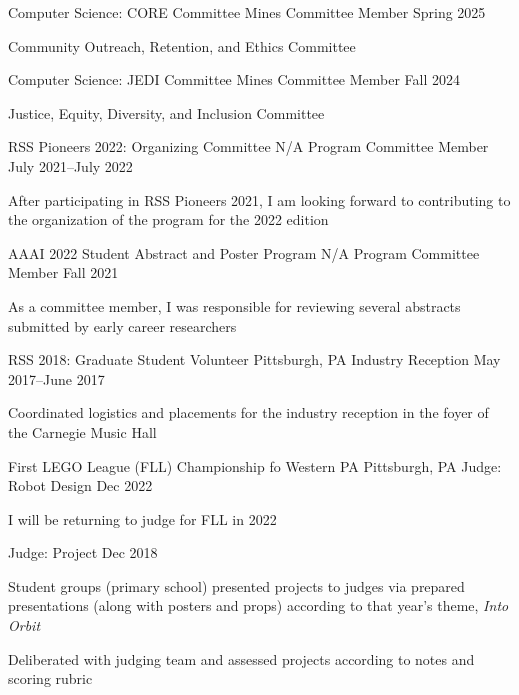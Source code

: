 
\begin{cventries}
  \cventry
  {Computer Science: CORE Committee}
  {Mines}
  {Committee Member}
  {Spring 2025}
  {
    \begin{cvitems}
    \item Community Outreach, Retention, and Ethics Committee
    \end{cvitems}
  }
  \cventry
  {Computer Science: JEDI Committee}
  {Mines}
  {Committee Member}
  {Fall 2024}
  {
    \begin{cvitems}
    \item Justice, Equity, Diversity, and Inclusion Committee
    \end{cvitems}
  }
  \cventry
  {RSS Pioneers 2022: Organizing Committee}
  {N/A}
  {Program Committee Member}
  {July 2021--July 2022}
  {
    \begin{cvitems}
    \item After participating in RSS Pioneers 2021, I am looking forward to
      contributing to the organization of the program for the 2022 edition
    \end{cvitems}
  }
  \cventry
  {AAAI 2022 Student Abstract and Poster Program}
  {N/A}
  {Program Committee Member}
  {Fall 2021}
  {
    \begin{cvitems}
    \item As a committee member, I was responsible for reviewing several
      abstracts submitted by early career researchers
    \end{cvitems}
  }
  \cventry
  {RSS 2018: Graduate Student Volunteer}
  {Pittsburgh, PA}
  {Industry Reception}
  {May 2017--June 2017}
  {
    \begin{cvitems}
    \item Coordinated logistics and placements for the industry reception
      in the foyer of the Carnegie Music Hall
    \end{cvitems}
  }
  \cventrytwo
  {First LEGO League (FLL) Championship fo Western PA}
  {Pittsburgh, PA}
  {Judge: Robot Design}
  {Dec 2022}
  {
    \begin{cvitems}
    \item I will be returning to judge for FLL in 2022
    \end{cvitems}
  }
  {Judge: Project}
  {
    Dec 2018
  }
  {
    \begin{cvitems}
    \item Student groups (primary school) presented projects to judges via
      prepared presentations (along with posters and props) according to that
      year's theme, \emph{Into Orbit}
    \item Deliberated with judging team and assessed projects according to
      notes and scoring rubric
    \end{cvitems}
  }
\end{cventries}
